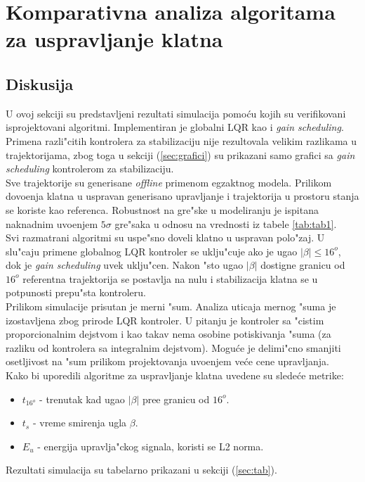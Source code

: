 \documentclass[a4paper,11pt]{article}
\theoremstyle{definition} \newtheorem{deff}{Definicija}[section]
\theoremstyle{definition} \newtheorem{prim}[deff]{Primer}
\theoremstyle{plain} \newtheorem{teor}[deff]{Teorema}
\begin{document}
	
	\newpage
	
	
	\section{Komparativna analiza algoritama za uspravljanje klatna} \label{sec:comp}
	\subsection{Diskusija}
	
	U ovoj sekciji su predstavljeni rezultati simulacija pomo\'cu kojih su verifikovani isprojektovani algoritmi. Implementiran je globalni LQR kao i \emph{gain scheduling}. Primena razli"citih kontrolera za stabilizaciju nije rezultovala velikim razlikama u trajektorijama, zbog toga u sekciji (\ref{sec:grafici}) su prikazani samo grafici sa \emph{gain scheduling} kontrolerom za stabilizaciju. \\ 
	
	Sve trajektorije su generisane \emph{offline} primenom egzaktnog modela. Prilikom dovo\dj enja klatna u uspravan generisano upravljanje i trajektorija u prostoru stanja se koriste kao referenca. Robustnost na gre"ske u modeliranju je ispitana naknadnim uvo\dj enjem $5\sigma$ gre"saka u odnosu na vrednosti iz tabele \ref{tab:tab1}.\\
	
	Svi razmatrani algoritmi su uspe"sno doveli klatno u uspravan polo"zaj. U slu"caju primene globalnog LQR kontroler se uklju"cuje ako je ugao $|\beta| \leq 16^o$, dok je \emph{gain scheduling} uvek uklju"cen. Nakon "sto ugao $|\beta|$ dostigne granicu od $16^o$ referentna trajektorija se postavlja na nulu i stabilizacija klatna se u potpunosti prepu"sta kontroleru.\\
	
	Prilikom simulacije prisutan je merni "sum. Analiza uticaja mernog "suma je izostavljena zbog prirode LQR kontroler. U pitanju je kontroler sa "cistim proporcionalnim dejstvom i kao takav nema osobine potiskivanja "suma (za razliku od kontrolera sa integralnim dejstvom). Mogu\'ce je delimi"cno smanjiti osetljivost na "sum prilikom projektovanja uvo\dj enjem ve\'ce cene upravljanja.\\
	
	Kako bi uporedili algoritme za uspravljanje klatna uvedene su slede\'ce metrike:
	\begin{itemize}
		\item $t_{16^o}$ - trenutak kad ugao $|\beta|$ pre\dj e granicu od $16^o$.
		\item $t_s$ - vreme smirenja ugla $\beta$.
		\item $E_u$ - energija upravlja"ckog signala, koristi se L2 norma.
	\end{itemize}
	Rezultati simulacija su tabelarno prikazani u sekciji (\ref{sec:tab}).\\
	
\end{document}
